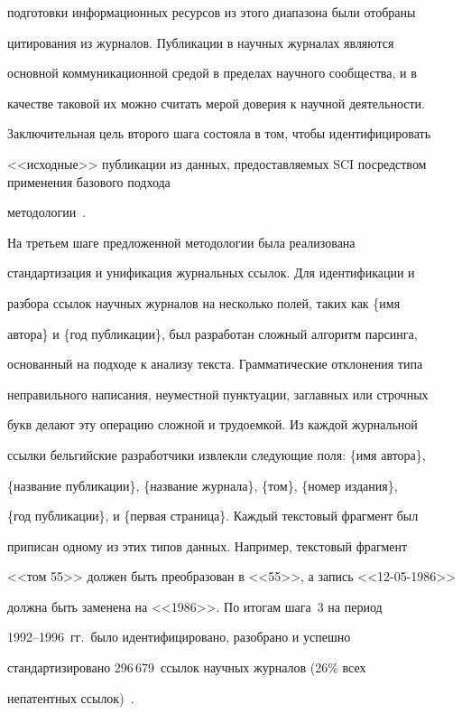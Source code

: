 подготовки информационных ресурсов из этого диапазона были отобраны 


цитирования из журналов. Пуб\-ли\-ка\-ции в научных журналах являются 


основной коммуникационной средой в пределах научного сообщества, и в 


качестве таковой их можно считать мерой доверия к научной деятельности. 


Заключительная цель второго шага состояла в том, чтобы идентифицировать 


<<исходные>> публикации из данных, предоставляемых SCI посредством применения базового подхода 


методологии~\cite{2-koz}.


     


     На третьем шаге предложенной методологии была реализована 


стандартизация и унификация журнальных ссылок. Для идентификации и 


разбора ссылок научных журналов на несколько полей, таких как \{имя 


автора\} и \{год публикации\}, был разработан сложный алгоритм парсинга, 


основанный на подходе к анализу текста. Грамматические отклонения типа 


неправильного написания, неуместной пунктуации, заглавных или строчных 


букв делают эту операцию сложной и трудоемкой. Из каждой журнальной 


ссылки бельгийские разработчики извлекли следующие поля: \{имя автора\}, 


\{название публикации\}, \{название журнала\}, \{том\}, \{номер издания\}, 


\{год публикации\}, и \{первая страница\}. Каждый текстовый фрагмент был 


приписан одному из этих типов данных. Например, текстовый фрагмент 


<<том 55>> должен быть преобразован в <<55>>, а запись <<12-05-1986>> 


должна быть заменена на <<1986>>. По итогам шага~3 на период 


     1992--1996~гг.\ было идентифицировано, разобрано и успешно 


стандартизировано 296\,679~ссылок научных журналов (26\% всех 


непатентных ссылок)~\cite{2-koz}.





